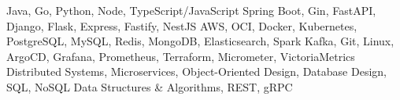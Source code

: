 \addvspace{-1.5ex}
\begin{cvskills}
    {Java, Go, Python, Node, TypeScript/JavaScript}
    {Spring Boot, Gin, FastAPI, Django, Flask, Express, Fastify, NestJS}
    {AWS, OCI, Docker, Kubernetes, PostgreSQL, MySQL, Redis, MongoDB, Elasticsearch, Spark
    \newline Kafka, Git, Linux, ArgoCD, Grafana, Prometheus, Terraform, Micrometer, VictoriaMetrics}
    {Distributed Systems, Microservices, Object-Oriented Design, Database Design, SQL, NoSQL
    \newline Data Structures \& Algorithms, REST, gRPC}
\end{cvskills}
